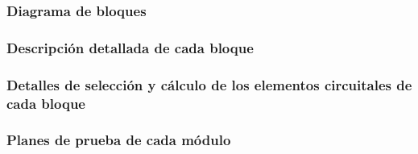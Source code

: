 \documentclass[../../../main.tex]{subfiles}
\begin{document}
\subsubsection{Diagrama de bloques}\label{subsubsec:diag_bloq}


\subsubsection{Descripción detallada de cada bloque}\label{subsubsec:desc_bloq}


\subsubsection{Detalles de selección y cálculo de los elementos circuitales de cada bloque}\label{subsubsec:det_sel_calc}


\subsubsection{Planes de prueba de cada módulo}\label{subsubsec:pruebas_mod}

\end{document}
